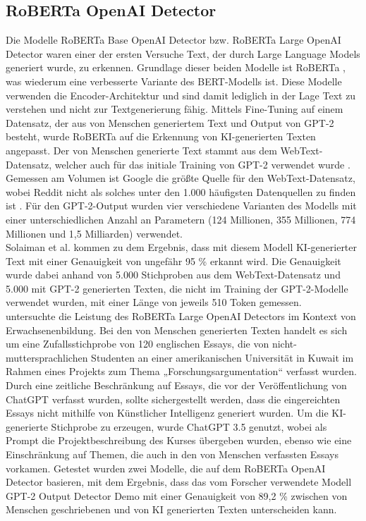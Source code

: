 \subsection{RoBERTa OpenAI Detector}
\label{subsec:robertaopenai}
Die Modelle RoBERTa Base OpenAI Detector bzw. RoBERTa Large OpenAI Detector waren einer der ersten Versuche Text, der durch Large Language Models generiert wurde, zu erkennen. Grundlage dieser beiden Modelle ist RoBERTa \autocite{RoBERTa2019}, was wiederum eine verbesserte Variante des BERT-Modells ist. Diese Modelle verwenden die Encoder-Architektur und sind damit lediglich in der Lage Text zu verstehen und nicht zur Textgenerierung fähig. Mittels Fine-Tuning auf einem Datensatz, der aus von Menschen generiertem Text und Output von GPT-2 besteht, wurde RoBERTa auf die Erkennung von
KI-generierten Texten angepasst. Der von Menschen generierte Text stammt aus dem WebText-Datensatz, welcher auch für das initiale Training von GPT-2 verwendet wurde \autocite{RoBERTaDetector2019}. Gemessen am Volumen ist Google die größte Quelle für den WebText-Datensatz, wobei Reddit nicht als solches unter den 1.000 häufigsten Datenquellen zu finden ist \autocite{gpt2dataset}. Für den GPT-2-Output wurden vier verschiedene Varianten des Modells mit einer unterschiedlichen Anzahl an Parametern (124 Millionen, 355 Millionen, 774 Millionen und 1,5 Milliarden) verwendet.\\
Solaiman et al. \autocite{RoBERTaDetector2019} kommen zu dem Ergebnis, dass mit diesem Modell KI-generierter Text mit einer Genauigkeit von ungefähr 95 \% erkannt wird. Die Genauigkeit wurde dabei anhand von 5.000 Stichproben aus dem WebText-Datensatz und 5.000 mit GPT-2 generierten Texten, die nicht im Training der GPT-2-Modelle verwendet wurden, mit einer Länge von jeweils 510 Token gemessen. \\
\autocite{Ibrahim2023UsingAD} untersuchte die Leistung des RoBERTa Large OpenAI Detectors im Kontext von Erwachsenenbildung. Bei den von Menschen generierten Texten handelt es sich um eine Zufallsstichprobe von 120 englischen Essays, die von nicht-muttersprachlichen Studenten an einer amerikanischen Universität in Kuwait im Rahmen eines Projekts zum Thema „Forschungsargumentation“ verfasst wurden. Durch eine zeitliche Beschränkung auf Essays, die vor der Veröffentlichung von ChatGPT verfasst wurden, sollte sichergestellt werden, dass die eingereichten Essays nicht mithilfe von Künstlicher Intelligenz generiert wurden. Um die KI-generierte Stichprobe zu erzeugen, wurde ChatGPT 3.5 genutzt, wobei als Prompt die Projektbeschreibung des Kurses übergeben wurden, ebenso wie eine Einschränkung auf Themen, die auch in den von Menschen verfassten Essays vorkamen. Getestet wurden zwei Modelle, die auf dem RoBERTa OpenAI Detector basieren, mit dem Ergebnis, dass das vom Forscher verwendete Modell GPT-2 Output Detector Demo mit einer Genauigkeit von 89,2 \% zwischen von Menschen geschriebenen und von KI generierten Texten unterscheiden kann.\\
